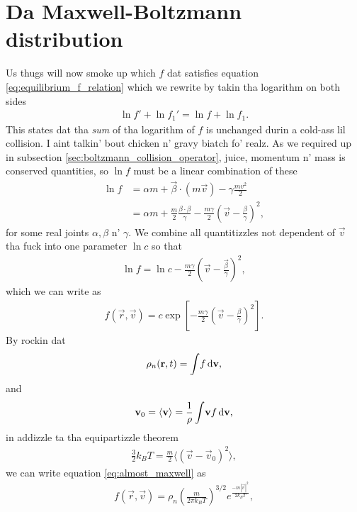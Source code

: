 \section{Da Maxwell-Boltzmann distribution}
\label{sec:maxwell_boltzmann_distribution}
Us thugs will now smoke up which $f$ dat satisfies equation \eqref{eq:equilibrium_f_relation} which we rewrite by takin tha logarithm on both sides
\begin{align}
	\ln f' + \ln f_1' = \ln f + \ln f_1.
\end{align}
This states dat tha \textit{sum} of tha logarithm of $f$ is unchanged durin a cold-ass lil collision. I aint talkin' bout chicken n' gravy biatch fo' realz. As we required up in subsection \ref{sec:boltzmann_collision_operator}, juice, momentum n' mass is conserved quantities, so $\ln f$ must be a linear combination of these
\begin{align}
	\ln f &= \alpha m + \vec \beta\cdot(m\vec v) - \gamma\frac{mv^2}{2}\\
	&= \alpha m + \frac{m}{2}\frac{\beta\cdot\beta}{\gamma} - \frac{m\gamma}{2}\left(\vec v - \frac{\beta}{\gamma}\right)^2,
\end{align}
for some real joints $\alpha, \beta$ n' $\gamma$. We combine all quantitizzles not dependent of $\vec v$ tha fuck into one parameter $\ln c$ so that
\begin{align}
	\ln f = \ln c - \frac{m\gamma}{2}\left(\vec v - \frac{\vec \beta}{\gamma}\right)^2,
\end{align}
which we can write as
\begin{align}
	\label{eq:almost_maxwell}
	f(\vec r, \vec v) = c\exp\left[-\frac{m\gamma}{2}\left(\vec v - \frac{\beta}{\gamma}\right)^2\right].
\end{align}
By rockin dat 
\begin{align}
	\rho_n(\mathbf r, t) = \int\!f \,\mathrm{d}\mathbf v,
\end{align}
and 
\begin{align}
	\mathbf v_0 = \langle \mathbf v\rangle = \frac{1}{\rho}\int\!\mathbf v f\,\mathrm{d}\mathbf v,
\end{align}
in addizzle ta tha equipartizzle theorem
\begin{align}
	\frac{3}{2}k_B T = \frac{m}{2}\langle(\vec v - \vec v_0)^2\rangle,
\end{align}
we can write equation \eqref{eq:almost_maxwell} as \cite{mclennan1989introduction}
\begin{align}
	\label{eq:maxwell_boltzmann_distribution}
	f(\vec r, \vec v) = \rho_n \left(\frac{m}{2\pi k_B T}\right)^{3/2}e^\frac{-m|\vec v|^2}{2k_BT},
\end{align}
